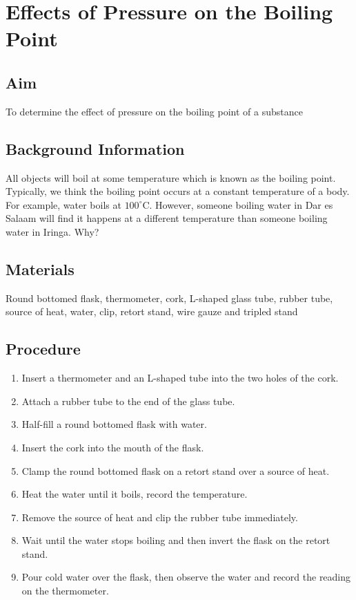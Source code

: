 \chapter{Effects of Pressure on the Boiling Point}

\section{Aim}
To determine the effect of pressure on the boiling point of a substance

\section{Background Information}
All objects will boil at some temperature which is known as the boiling point. Typically, we think the boiling point occurs at a constant temperature of a body. For example, water boils at $100^\circ$C. However, someone boiling water in Dar es Salaam will find it happens at a different temperature than someone boiling water in Iringa. Why? 

\section{Materials}
Round bottomed flask, thermometer, cork, L-shaped glass tube, rubber tube, source of heat, water, clip, retort stand, wire gauze and tripled stand

\section{Procedure}
\begin{enumerate}
\item Insert a thermometer and an L-shaped tube into the two holes of the cork.  
\item Attach a rubber tube to the end of the glass tube.
\item Half-fill a round bottomed flask with water.
\item Insert the cork into the mouth of the flask.
\item Clamp the round bottomed flask on a retort stand over a source of heat. 
\item Heat the water until it boils, record the temperature. 
\item Remove the source of heat and clip the rubber tube immediately.
\item Wait until the water stops boiling and then invert the flask on the retort stand.
\item Pour cold water over the flask, then observe the water and record the reading on the thermometer. 
\end{enumerate}

